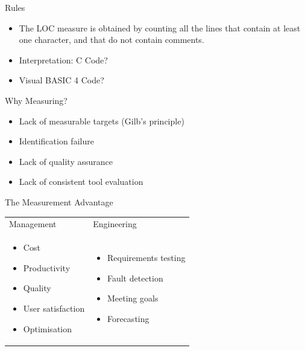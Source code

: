 \documentclass{beamer}
\begin{document}
\begin{frame}{\centerline{Rules}}
\begin{itemize}    
    \item The LOC measure is obtained by counting all the lines that contain at least one character, and that do not contain comments.
    \item Interpretation: C Code?
    \item Visual BASIC 4 Code?
\end{itemize}
\end{frame}

\begin{frame}{\centerline{Why Measuring?}}

\begin{itemize}
\item Lack of measurable targets (Gilb's principle)
\item Identification failure
\item Lack of quality assurance
\item Lack of consistent tool evaluation
\end{itemize}

\end{frame}

\begin{frame}{\centerline{The Measurement Advantage}}
\begin{table}[H]

\begin{tabulary}{\textwidth}{m{5.5cm} m{5.5cm}}
Management &
Engineering \\

\begin{itemize}    
    \item Cost
    \item Productivity
    \item Quality
    \item User satisfaction
    \item Optimisation
\end{itemize} &
\begin{itemize}    
    \item Requirements testing
    \item Fault detection
    \item Meeting goals
    \item Forecasting
\end{itemize}
\end{tabulary}
\end{table}

\end{frame}
\end{document}
